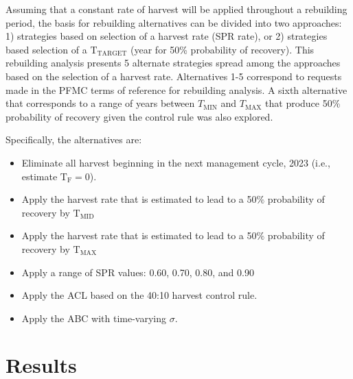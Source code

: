 \documentclass[11pt,
  english,
  a4paper,
]{article}
\begin{document}
\leavevmode\tagmcend\tagstructend


Assuming that a constant rate of harvest will be applied throughout a rebuilding period, the basis for rebuilding alternatives can be divided into two approaches: 1) strategies based on selection of a harvest rate (SPR rate), or 2) strategies based selection of a {\(\text{T}_\text{TARGET}\)\leavevmode\tagmcend\tagstructend} (year for 50\% probability of recovery). This rebuilding analysis presents 5 alternate strategies spread among the approaches based on the selection of a harvest rate. Alternatives 1-5 correspond to requests made in the PFMC terms of reference for rebuilding analysis. A sixth alternative that corresponds to a range of years between {\(T_\text{MIN}\)\leavevmode\tagmcend\tagstructend} and {\(T_\text{MAX}\)\leavevmode\tagmcend\tagstructend} that produce 50\% probability of recovery given the control rule was also explored.

\leavevmode\tagmcend\tagstructend\par

Specifically, the alternatives are:

\begin{itemize}
    \item Eliminate all harvest beginning in the next management cycle, 2023 (i.e., estimate $\text{T}_\text{F} = 0$).
    \item Apply the harvest rate that is estimated to lead to a 50$\%$ probability of recovery by $\text{T}_\text{MID}$ 
    \item Apply the harvest rate that is estimated to lead to a 50$\%$ probability of recovery by $\text{T}_\text{MAX}$
    \item Apply a range of SPR values: 0.60, 0.70, 0.80, and 0.90 
    \item Apply the ACL based on the 40:10 harvest control rule.
    \item Apply the ABC with time-varying $\sigma$.
\end{itemize}


\hypertarget{results}{%
\section{Results}\label{results}}
\end{document}
